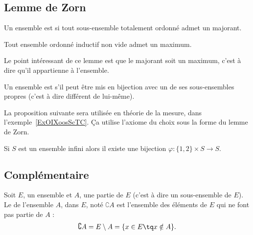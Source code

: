 \subsection{Lemme de Zorn}

\begin{definition}  \label{DefGHDfyyz}
    Un ensemble est  si tout sous-ensemble totalement ordonné admet un majorant.
\end{definition}


\begin{lemma}    \label{LemUEGjJBc}
    Tout ensemble ordonné inductif non vide admet un maximum.
\end{lemma}
Le point intéressant de ce lemme est que le majorant soit un maximum, c'est à dire qu'il appartienne à l'ensemble.

\begin{definition}      \label{DefEOZLooUMCzZR}
    Un ensemble est  s'il peut être mis en bijection avec un de ses sous-ensembles propres (c'est à dire différent de lui-même).
\end{definition}

La proposition suivante sera utilisée en théorie de la mesure, dans l'exemple~\ref{ExOIXoosScTC}. Ça utilise l'axiome du choix sous la forme du lemme de Zorn.
\begin{proposition} \label{PropVCSooMzmIX}
    Si \( S\) est un ensemble infini alors il existe une bijection \( \varphi\colon \{ 1,2 \}\times S\to S\).
\end{proposition}

\subsection{Complémentaire}
\label{AppComplement}

\begin{definition}
    Soit $E$, un ensemble et $A$, une partie de $E$ (c'est à dire un sous-ensemble de $E$). Le  de l'ensemble $A$, dans $E$, noté $\complement A$ est l'ensemble des éléments de $E$ qui ne font pas partie de $A$ :
    \begin{equation}
	    \complement A=E\setminus A=\{ x\in E\tq x\notin A \}.
    \end{equation}
\end{definition}

